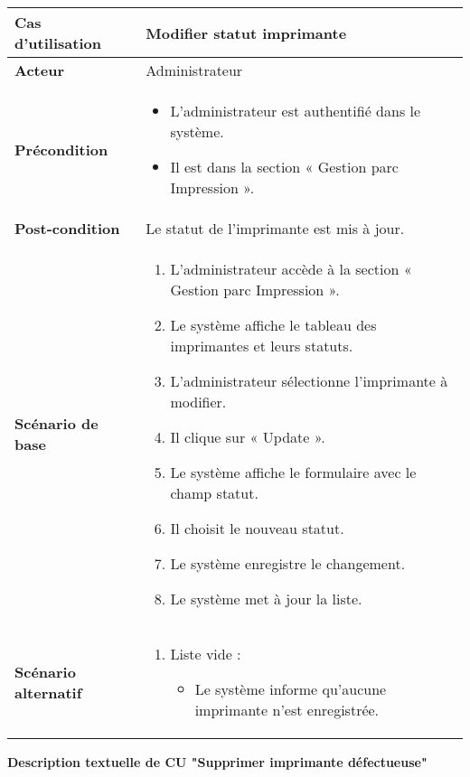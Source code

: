 \documentclass[a4paper,11pt]{report}
\begin{document}
\begin{tabularx}{\textwidth}{|>{\bfseries}l|X|}
\hline
Cas d’utilisation    & Modifier statut imprimante \\
\hline
Acteur               & Administrateur \\
\hline
Précondition         &
\begin{itemize}[left=0pt]
  \item L’administrateur est authentifié dans le système.
  \item Il est dans la section « Gestion parc Impression ».
\end{itemize} \\
\hline
Post-condition       & Le statut de l’imprimante est mis à jour. \\
\hline
Scénario de base     &
\begin{enumerate}[left=0pt]
  \item L’administrateur accède à la section « Gestion parc Impression ».
  \item Le système affiche le tableau des imprimantes et leurs statuts.
  \item L’administrateur sélectionne l’imprimante à modifier.
  \item Il clique sur « Update ».
  \item Le système affiche le formulaire avec le champ statut.
  \item Il choisit le nouveau statut.
  \item Le système enregistre le changement.
  \item Le système met à jour la liste.
\end{enumerate} \\
\hline
Scénario alternatif   &
\begin{enumerate}[label=\arabic*.a,wide=0pt]
  \item Liste vide :
    \begin{itemize}[left=1em]
      \item Le système informe qu’aucune imprimante n’est enregistrée.
    \end{itemize}
\end{enumerate} \\
\hline
\end{tabularx}


\textbf{Description textuelle de CU "Supprimer imprimante défectueuse"}
\end{document}
